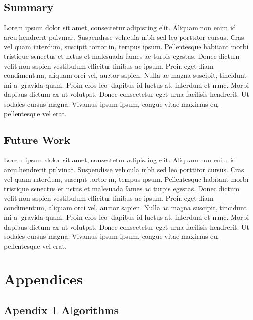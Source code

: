 \documentclass[
  openany]{book}
\begin{document}
\hypertarget{summary}{%
\section{Summary}\label{summary}}

Lorem ipsum dolor sit amet, consectetur adipiscing elit. Aliquam non enim id arcu hendrerit pulvinar. Suspendisse vehicula nibh sed leo porttitor cursus. Cras vel quam interdum, suscipit tortor in, tempus ipsum. Pellentesque habitant morbi tristique senectus et netus et malesuada fames ac turpis egestas. Donec dictum velit non sapien vestibulum efficitur finibus ac ipsum. Proin eget diam condimentum, aliquam orci vel, auctor sapien. Nulla ac magna suscipit, tincidunt mi a, gravida quam. Proin eros leo, dapibus id luctus at, interdum et nunc. Morbi dapibus dictum ex ut volutpat. Donec consectetur eget urna facilisis hendrerit. Ut sodales cursus magna. Vivamus ipsum ipsum, congue vitae maximus eu, pellentesque vel erat.

\hypertarget{future-work}{%
\section{Future Work}\label{future-work}}

Lorem ipsum dolor sit amet, consectetur adipiscing elit. Aliquam non enim id arcu hendrerit pulvinar. Suspendisse vehicula nibh sed leo porttitor cursus. Cras vel quam interdum, suscipit tortor in, tempus ipsum. Pellentesque habitant morbi tristique senectus et netus et malesuada fames ac turpis egestas. Donec dictum velit non sapien vestibulum efficitur finibus ac ipsum. Proin eget diam condimentum, aliquam orci vel, auctor sapien. Nulla ac magna suscipit, tincidunt mi a, gravida quam. Proin eros leo, dapibus id luctus at, interdum et nunc. Morbi dapibus dictum ex ut volutpat. Donec consectetur eget urna facilisis hendrerit. Ut sodales cursus magna. Vivamus ipsum ipsum, congue vitae maximus eu, pellentesque vel erat.

\hypertarget{appendices}{%
\chapter*{Appendices}\label{appendices}}

\hypertarget{apendix-1-algorithms}{%
\section{Apendix 1 Algorithms}\label{apendix-1-algorithms}}
\end{document}
